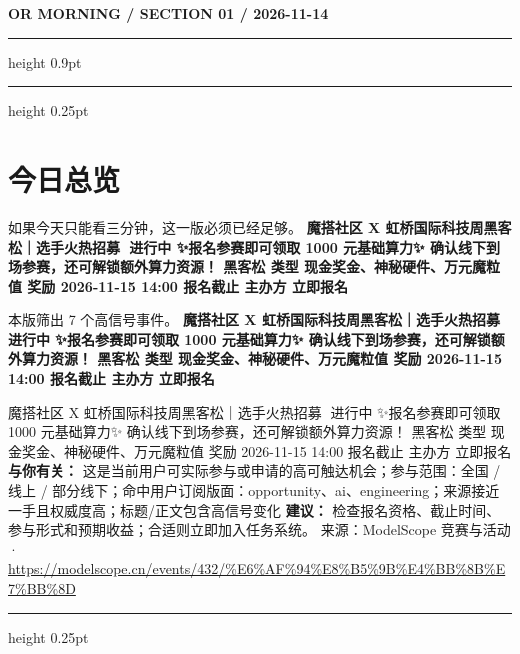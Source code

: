 \documentclass[10.5pt]{ctexart}
\begin{document}
{\small\bfseries OR MORNING / SECTION 01 / 2026-11-14}
\vspace{2mm}
\hrule height 0.9pt
\vspace{1.5mm}
\hrule height 0.25pt
\vspace{4mm}
\section*{今日总览}
{\color{ormuted} 如果今天只能看三分钟，这一版必须已经足够。}
\vspace{2mm}
{\fontsize{25}{29}\selectfont\bfseries 魔搭社区 X 虹桥国际科技周黑客松｜选手火热招募🚀 进行中 ✨报名参赛即可领取 1000 元基础算力✨ 确认线下到场参赛，还可解锁额外算力资源！ 黑客松 类型 现金奖金、神秘硬件、万元魔粒值 奖励 2026-11-15 14:00 报名截止 主办方 立即报名}\par
\vspace{2mm}
{\large 本版筛出 7 个高信号事件。}
\vspace{3mm}
{\Large\bfseries 魔搭社区 X 虹桥国际科技周黑客松｜选手火热招募🚀 进行中 ✨报名参赛即可领取 1000 元基础算力✨ 确认线下到场参赛，还可解锁额外算力资源！ 黑客松 类型 现金奖金、神秘硬件、万元魔粒值 奖励 2026-11-15 14:00 报名截止 主办方 立即报名}\par
魔搭社区 X 虹桥国际科技周黑客松｜选手火热招募🚀 进行中 ✨报名参赛即可领取 1000 元基础算力✨ 确认线下到场参赛，还可解锁额外算力资源！ 黑客松 类型 现金奖金、神秘硬件、万元魔粒值 奖励 2026-11-15 14:00 报名截止 主办方 立即报名
\textbf{与你有关：} 这是当前用户可实际参与或申请的高可触达机会；参与范围：全国 / 线上 / 部分线下；命中用户订阅版面：opportunity、ai、engineering；来源接近一手且权威度高；标题/正文包含高信号变化
\textbf{建议：} 检查报名资格、截止时间、参与形式和预期收益；合适则立即加入任务系统。
{\footnotesize\color{ormuted} 来源：ModelScope 竞赛与活动 · \url{https://modelscope.cn/events/432/%E6%AF%94%E8%B5%9B%E4%BB%8B%E7%BB%8D}}
\vspace{3mm}
\hrule height 0.25pt
\vspace{3mm}
\end{document}
